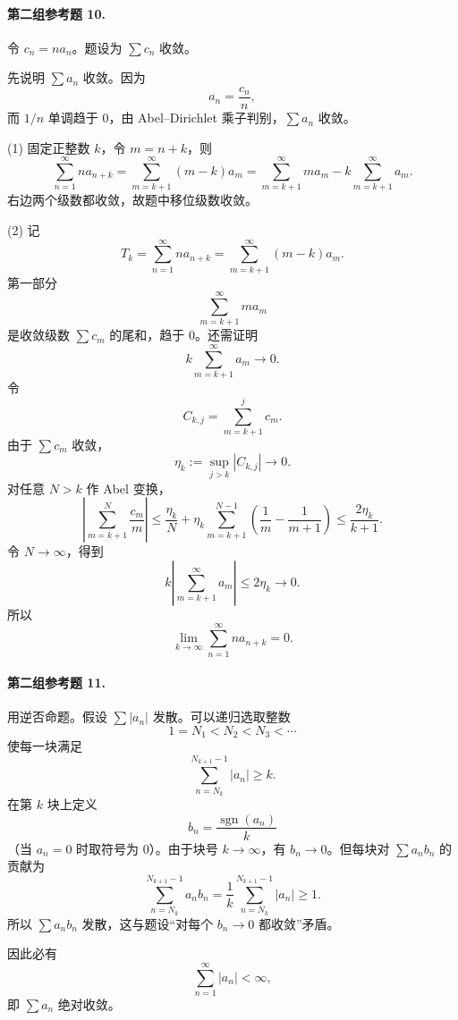\paragraph{第二组参考题 10.}
\begin{xsolution}
令 $c_n=na_n$。题设为 $\sum c_n$ 收敛。

先说明 $\sum a_n$ 收敛。因为
\[
 a_n=\frac{c_n}{n},
\]
而 $1/n$ 单调趋于 $0$，由 Abel--Dirichlet 乘子判别，$\sum a_n$ 收敛。

(1) 固定正整数 $k$，令 $m=n+k$，则
\[
 \sum_{n=1}^{\infty}na_{n+k}
 =\sum_{m=k+1}^{\infty}(m-k)a_m
 =\sum_{m=k+1}^{\infty}ma_m-k\sum_{m=k+1}^{\infty}a_m.
\]
右边两个级数都收敛，故题中移位级数收敛。

(2) 记
\[
 T_k=\sum_{n=1}^{\infty}na_{n+k}
 =\sum_{m=k+1}^{\infty}(m-k)a_m.
\]
第一部分
\[
 \sum_{m=k+1}^{\infty}ma_m
\]
是收敛级数 $\sum c_m$ 的尾和，趋于 $0$。还需证明
\[
 k\sum_{m=k+1}^{\infty}a_m\to0.
\]
令
\[
 C_{k,j}=\sum_{m=k+1}^{j}c_m.
\]
由于 $\sum c_m$ 收敛，
\[
 \eta_k:=\sup_{j>k}|C_{k,j}|\longrightarrow0.
\]
对任意 $N>k$ 作 Abel 变换，
\[
 \left|\sum_{m=k+1}^{N}\frac{c_m}{m}\right|
 \leq\frac{\eta_k}{N}+\eta_k\sum_{m=k+1}^{N-1}\left(\frac1m-\frac1{m+1}\right)
 \leq\frac{2\eta_k}{k+1}.
\]
令 $N\to\infty$，得到
\[
 k\left|\sum_{m=k+1}^{\infty}a_m\right|
 \leq2\eta_k\longrightarrow0.
\]
所以
\[
 \boxed{\lim_{k\to\infty}\sum_{n=1}^{\infty}na_{n+k}=0.}
\]
\end{xsolution}

\paragraph{第二组参考题 11.}
\begin{xsolution}
用逆否命题。假设 $\sum|a_n|$ 发散。可以递归选取整数
\[
 1=N_1<N_2<N_3<\cdots
\]
使每一块满足
\[
 \sum_{n=N_k}^{N_{k+1}-1}|a_n|\geq k.
\]
在第 $k$ 块上定义
\[
 b_n=\frac{\operatorname{sgn}(a_n)}{k}
\]
（当 $a_n=0$ 时取符号为 $0$）。由于块号 $k\to\infty$，有 $b_n\to0$。但每块对 $\sum a_nb_n$ 的贡献为
\[
 \sum_{n=N_k}^{N_{k+1}-1}a_nb_n
 =\frac1k\sum_{n=N_k}^{N_{k+1}-1}|a_n|\geq1.
\]
所以 $\sum a_nb_n$ 发散，这与题设“对每个 $b_n\to0$ 都收敛”矛盾。

因此必有
\[
 \boxed{\sum_{n=1}^{\infty}|a_n|<\infty},
\]
即 $\sum a_n$ 绝对收敛。
\end{xsolution}

